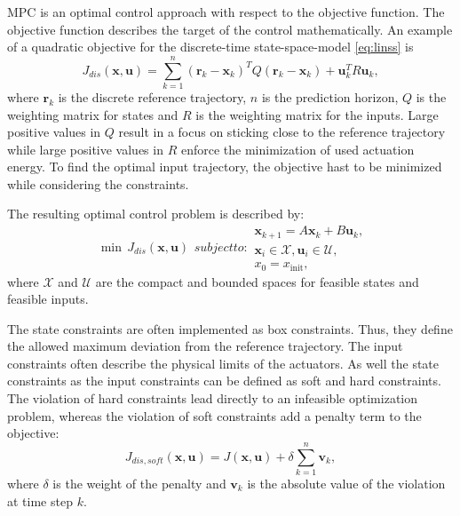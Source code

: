 MPC is an optimal control approach with respect to the objective function.
The objective function describes the target of the control mathematically.
An example of a quadratic objective for the discrete-time state-space-model \eqref{eq:linss} is
\begin{equation}\label{eq:quadratic_cost}
J_{dis}(\mathbf{x},\mathbf{u}) = \sum_{k=1}^{n} (\mathbf{r}_k-\mathbf{x}_k)^TQ(\mathbf{r}_k-\mathbf{x}_k)+\mathbf{u}_k^TR\mathbf{u}_k,
\end{equation}
where $\mathbf{r}_k$ is the discrete reference trajectory, $n$ is the prediction horizon, $Q$ is the weighting matrix for states and $R$ is the weighting matrix for the inputs.
Large positive values in $Q$ result in a focus on sticking close to the reference trajectory while large positive values in $R$ enforce the minimization of used actuation energy.
To find the optimal input trajectory, the objective hast to be minimized while considering the constraints.

The resulting optimal control problem is described by:
\begin{subequations} \label{eq:description_conventional_mpc}
\begin{align}
\min \, J_{dis}(\mathbf{x},\mathbf{u})
\end{align}
subject to:
\begin{align}
\mathbf{x}_{k+1} = A\mathbf{x}_k+B\mathbf{u}_k,\\
\mathbf{x}_i \in \mathcal{X}, \mathbf{u}_i  \in \mathcal{U},\\
x_0 = x_{\text{init}},
\end{align}
\end{subequations}
where $\mathcal{X}$ and $\mathcal{U}$ are the compact and bounded spaces for feasible states and feasible inputs.

The state constraints are often implemented as box constraints.
Thus, they define the allowed maximum deviation from the reference trajectory.
The input constraints often describe the physical limits of the actuators.
As well the state constraints as the input constraints can be defined as soft and hard constraints.
The violation of hard constraints lead directly to an infeasible optimization problem, whereas the violation of soft constraints add a penalty term to the objective:
\begin{equation}\label{eq:soft}
J_{dis,soft}(\mathbf{x},\mathbf{u}) = J(\mathbf{x},\mathbf{u}) + \delta \sum_{k=1}^{n} \mathbf{v}_k,
\end{equation}
where $\delta$ is the weight of the penalty and $\mathbf{v}_k$ is the absolute value of the violation at time step $k$.

